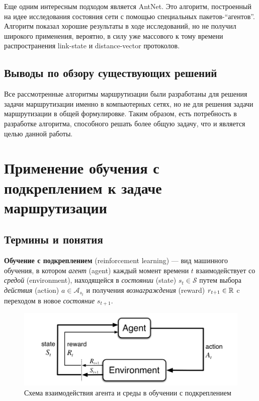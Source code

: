 \documentclass[specification, annotation]{itmo-student-thesis}
\begin{document}
Еще одним интересным подходом является AntNet\cite{di1998antnet}. Это алгоритм,
построенный на идее исследования состояния сети с помощью специальных
пакетов-``агентов''. Алгоритм показал хорошие результаты в ходе исследований, но
не получил широкого применения, вероятно, в силу уже массового к тому времени
распространения link-state и distance-vector протоколов.

\subsection{Выводы по обзору существующих решений}\label{routing-overview-end}

Все рассмотренные алгоритмы маршрутизации были разработаны для
решения задачи маршрутизации именно в компьютерных сетях, но не для решения
задачи маршрутизации в общей формулировке. Таким образом, есть потребность в
разработке алгоритма, способного решать более общую задачу, что и является целью
данной работы.

\section{Применение обучения с подкреплением к задаче маршрутизации}

\subsection{Термины и понятия}

\textbf{Обучение с подкреплением} (reinforcement learning) --- вид машинного
обучения, в котором \textit{агент} (agent) каждый момент времени $t$
взаимодействует со \textit{средой} (environment), находящейся в
\textit{состоянии} (state) $s_t \in \mathcal{S}$ путем выбора
\textit{действия} (action) $a \in \mathcal{A}_{s_t}$ и получения
\textit{вознаграждения} (reward) $r_{t+1} \in \Bbb{R}$ c переходом в новое
\textit{состояние} $s_{t+1}$.

\begin{figure}[!h]
  \caption{Схема взаимодействия агента и среды в обучении с подкреплением}\label{rl-scheme}
  \centering
  \includegraphics[scale=0.5]{rl-scheme}
\end{figure}
\end{document}
